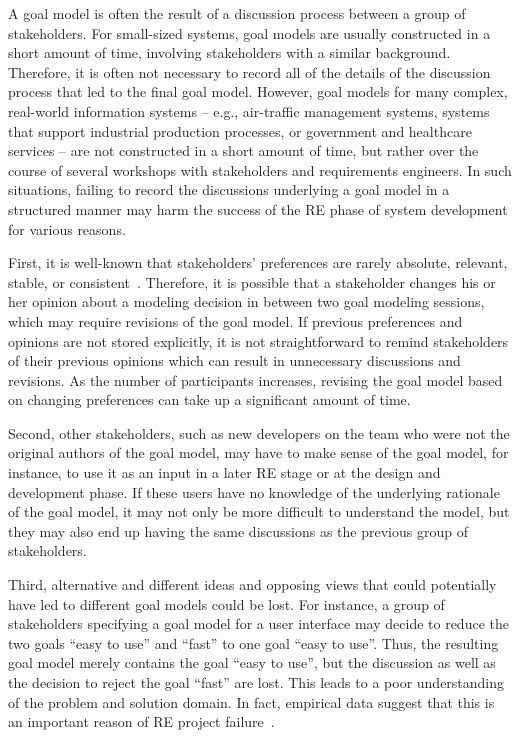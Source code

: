 A goal model is often the result of a discussion process between a group of stakeholders. For small-sized systems, goal models are usually constructed in a short amount of time, involving stakeholders with a similar background. Therefore, it is often not necessary to record all of the details of the discussion process that led to the final goal model. However, goal models for many complex, real-world information systems -- e.g., air-traffic management systems, systems that support industrial production processes, or government and healthcare services -- are not constructed in a short amount of time, but rather over the course of several workshops with stakeholders and requirements engineers. In such situations, failing to record the discussions underlying a goal model in a structured manner may harm the success of the RE phase of system development for various reasons. 

First, it is well-known that stakeholders' preferences are rarely absolute, relevant, stable, or consistent~\cite{march1978bounded}. Therefore, it is possible that a stakeholder changes his or her opinion about a modeling decision in between two goal modeling sessions, which may require revisions of the goal model. If previous preferences and opinions are not stored explicitly, it is not straightforward to remind stakeholders of their previous opinions which can result in unnecessary discussions and revisions. As the number of participants increases, revising the goal model based on changing preferences can take up a significant amount of time. 

Second, other stakeholders, such as new developers on the team who were not the original authors of the goal model, may have to make sense of the goal model, for instance, to use it as an input in a later RE stage or at the design and development phase. If these users have no knowledge of the underlying rationale of the goal model, it may not only be more difficult to understand the model, but they may also end up having the same discussions as the previous group of stakeholders.

Third, alternative and different ideas and opposing views that could potentially have led to different goal models could be lost. For instance, a group of stakeholders specifying a goal model for a user interface may decide to reduce the two goals ``easy to use'' and ``fast'' to one goal ``easy to use''. Thus, the resulting goal model merely contains the goal ``easy to use'', but the discussion as well as the decision to reject the goal ``fast'' are lost. This leads to a poor understanding of the problem and solution domain. In fact, empirical data suggest that this is an important reason of RE project failure~\cite{curtis1988field}. 

